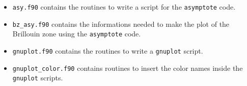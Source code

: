 \documentclass[12pt,a4paper]{article}
\begin{document}
\begin{itemize}
\item
\texttt{asy.f90} contains the routines to write a script for the
\texttt{asymptote} code.

\item
\texttt{bz\_asy.f90} contains the informations needed to make the plot       
of the Brillouin zone using the \texttt{asymptote} code.      

\item
\texttt{gnuplot.f90} contains the routines to write a \texttt{gnuplot} script.

\item
\texttt{gnuplot\_color.f90} contains routines to insert the color names
inside the \texttt{gnuplot} scripts.

\end{itemize}
\end{document}
